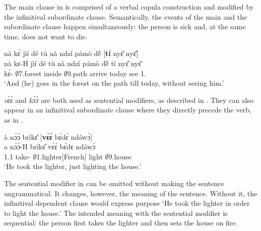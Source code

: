 \noindent The main clause in  is comprised of a verbal copula construction and modified by the infinitival subordinate clause. Semantically, the events of the main and the subordinate clause happen simultaneously: the person is sick and, at the same time, does not want to die.



\ea\label{InfAdv2}
  \glll    nà kɛ́ jìí dé tù nà ndzǐ pámò dẽ̂ [{\bfseries tí} nyɛ̂ nyɛ̂]\textsubscript{{\SUB}} \\
          nà kɛ-H jìí dé tù nà ndzǐ pámò dẽ̂ {\db}tí nyɛ̂ nyɛ̂ \\
         {\COM} kɛ̀-{\R} $\emptyset$7.forest {\LOC} inside {\COM} $\emptyset$9.path arrive today {\db}{\NEG} see 1.{\OBJ} \\
    \trans `And (he) goes in the forest on the path till today, without seeing him.'
\z


{\itshape vɛ̀ɛ̀} and {\itshape kɔ́ɔ̀} are both used as sentential modifiers, as described in . They can also appear in an infinitival subordinate clause where they directly precede the verb, as in .



\ea\label{InfAdv3} 
  \glll  à nɔ̀ɔ́ brìkɛ̂ [{\bfseries vɛ̀ɛ̀} bɛ́dɛ̀ ndáwɔ̀]\textsubscript{{\SUB}} \\
         a nɔ̀ɔ̀-H brìkɛ̂ {\db}vɛ̀ɛ̀ bɛ́dɛ ndáwɔ̀ \\
           1.{\PST}1 take-{\R} $\emptyset$1.lighter[French] {\db}{\SEQU} light $\emptyset$9.house \\
    \trans `He took the lighter, just lighting the house.'
\z

\noindent The sentential modifier in  can be omitted without making the sentence ungrammatical. It changes, however, the meaning of the sentence. Without it, the infinitival dependent clause would express purpose `He took the lighter in order to light the house.' The intended meaning with the  sentential modifier is sequential: the person first takes the lighter and then sets the house on fire.

